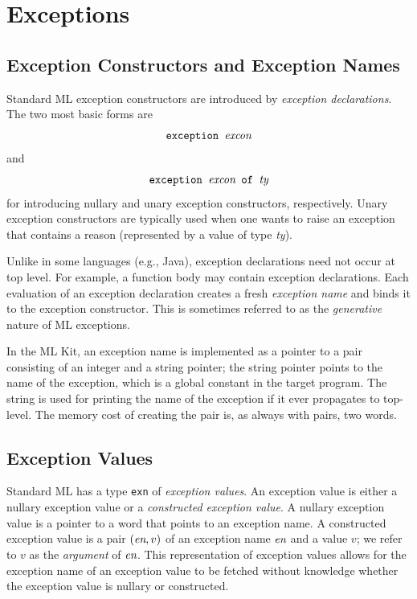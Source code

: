 \documentclass[12pt]{book}
\begin{document}
\chapter{Exceptions}
\label{exceptions.sec}
\section{Exception Constructors and Exception Names}
Standard ML
%
exception constructors are introduced by
% 
{\em exception declarations}. The two most basic forms are
$$\hbox{\tt exception {\it excon}}$$
and 
$$\hbox{\tt exception {\it excon} of {\it ty}}$$
for introducing nullary and unary exception constructors,
respectively. Unary exception constructors are typically
used when one wants to raise an exception that contains a
reason (represented by a value of type {\it ty}).

Unlike in some languages (e.g., Java), exception declarations need not
occur at top level. For example, a function body may contain exception
declarations.  Each evaluation of an exception declaration creates a
fresh
%
{\em exception name\/} and binds it to the exception constructor. This
is sometimes referred to as the {\em generative\/} nature of ML
exceptions.

In the ML Kit, an exception name is implemented as a pointer to a pair
consisting of an integer and a string pointer; the string pointer
points to the name of the exception, which is a global constant in the
target program. The string is used for printing the name of the
exception if it ever propagates to top-level. The memory cost of creating
the pair is, as always with pairs, two words.

\section{Exception Values}
Standard ML has a type 
%
{\tt exn} of 
%
{\em exception values}.  An exception value is either a
%
nullary exception value or a 
%
{\em constructed exception value}. A nullary exception value is a
pointer to a word that points to an exception name. A constructed
exception value is a pair $(\hbox{\it en},v)$ of an exception name $\hbox{\it en}$
and a value $v$; we refer to $v$ as the {\em argument\/} of $\hbox{\it en}$.
This representation of exception values allows for the exception name
of an exception value to be fetched without knowledge whether the
exception value is nullary or constructed.
\end{document}
